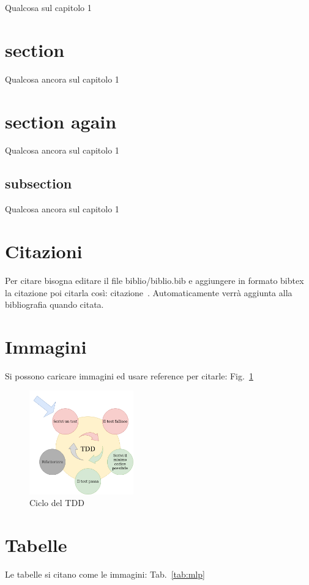 %
%
Qualcosa sul capitolo 1
\section{section}
Qualcosa ancora sul capitolo 1
\section{section again}
Qualcosa ancora sul capitolo 1
\subsection{subsection}
Qualcosa ancora sul capitolo 1

\section{Citazioni}
Per citare bisogna editare il file biblio/biblio.bib e aggiungere in formato bibtex la citazione poi citarla così: citazione~\cite{STORY}. 
Automaticamente verrà aggiunta alla bibliografia quando citata.

\section{Immagini}
Si possono caricare immagini ed usare reference per citarle: Fig.~\ref{fig:TDD}
\begin{figure}[H]
    \begin{flushright}
        \centering
        \includegraphics[width=0.4\textwidth]{imgs/TDDCycle.png}
        \caption{Ciclo del TDD}
        \label{fig:TDD}
    \end{flushright}
\end{figure}

\section{Tabelle}
Le tabelle si citano come le immagini: Tab.~\ref{tab:mlp}

